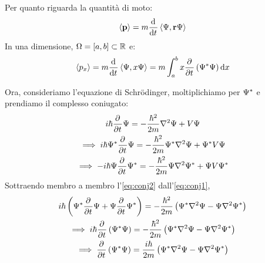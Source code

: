Per quanto riguarda la quantità di moto:
\begin{equation}
    \avg{\vt{p}} = m \der{t} \inner{\Psi}{\p \Psi}
\end{equation}
In una dimensione, $\Omega = [a, b] \subset \mathbb{R}$ e:
\begin{equation}
    \avg{p_x} = m \der{t} \inner{\Psi}{x \Psi}
    = m \int_a^b x \parder{t}\pts{\conj{\Psi} \Psi} \de x
\end{equation}

Ora, consideriamo l'equazione di Schrödinger, moltiplichiamo per $\Psi^*$ e prendiamo il complesso coniugato:
\begin{gather}
    \im \hbar \parder{t} \Psi = -\frac{\hbar^2}{2 m} \lapl \Psi + V \Psi \\
\label{eq:conj1}
    \implies \im \hbar \conj{\Psi} \parder{t} \Psi = -\frac{\hbar^2}{2 m} \conj{\Psi} \lapl \Psi + \conj{\Psi} V \Psi \\
\label{eq:conj2}
    \implies -\im \hbar \Psi \parder{t} \conj{\Psi} = -\frac{\hbar^2}{2 m} \Psi \lapl \conj{\Psi} + \Psi V \conj{\Psi}
\end{gather}
Sottraendo membro a membro l'\cref{eq:conj2} dall'\cref{eq:conj1},
\begin{gather}
    \im \hbar \pts{\conj{\Psi} \parder{t} \Psi + \Psi \parder{t} \conj{\Psi}}
    = -\frac{\hbar^2}{2 m} \pts{\conj{\Psi} \lapl \Psi - \Psi \lapl \conj{\Psi}} \\
    \implies \im \hbar \parder{t} \pts{\conj{\Psi} \Psi}
    = -\frac{\hbar^2}{2 m} \pts{\conj{\Psi} \lapl \Psi - \Psi \lapl \conj{\Psi}} \\
    \implies  \parder{t} \pts{\conj{\Psi} \Psi} = \frac{\im \hbar}{2 m} \pts{\conj{\Psi} \lapl \Psi - \Psi \lapl \conj{\Psi}}
\end{gather}

